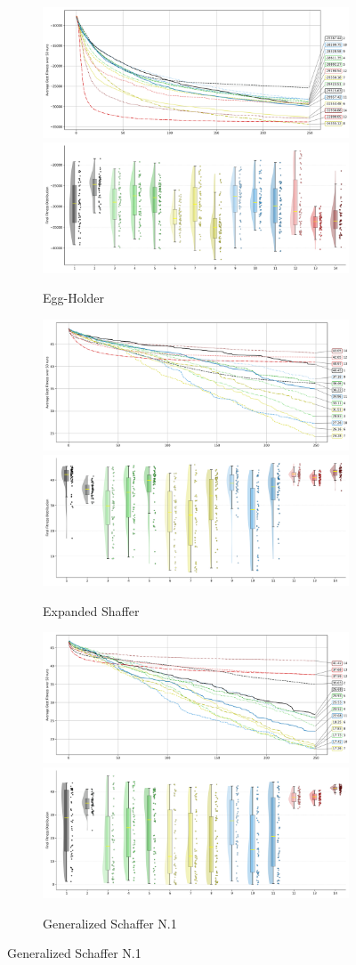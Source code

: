 \begin{figure}[p]
\begin{subfigure}{1\textwidth}
    \centering
    \includegraphics[width=.49\textwidth]{Figures/results/100/Egg_Holder_All_selected_algorithms_dim100_annot_legend.png}
    \includegraphics[width=.49\textwidth]{Figures/results/100/Egg_Holder_all_dim100_raincloud_vertical.png}
    \caption{Egg-Holder}
\end{subfigure}

\begin{subfigure}{1\textwidth}
    \centering
    \includegraphics[width=.49\textwidth]{Figures/results/100/Expanded_Shaffer_All_selected_algorithms_dim100_annot_legend.png}
    \includegraphics[width=.49\textwidth]{Figures/results/100/Expanded_Shaffer_all_dim100_raincloud_vertical.png}
    \caption{Expanded Shaffer}
\end{subfigure}

\begin{subfigure}{1\textwidth}
    \centering
    \includegraphics[width=.49\textwidth]{Figures/results/100/Generalized_Schaffer_N1_All_selected_algorithms_dim100_annot_legend.png}
    \includegraphics[width=.49\textwidth]{Figures/results/100/Generalized_Schaffer_N1_all_dim100_raincloud_vertical.png}
    \caption{Generalized Schaffer N.1}
\end{subfigure}


\end{figure}
